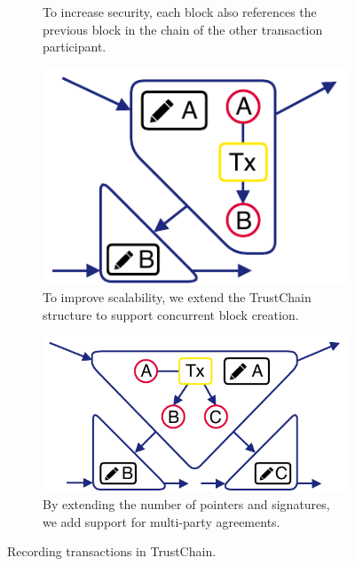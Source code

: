 \begin{figure}[t]
\begin{subfigure}[t]{.33\textwidth}
		\caption{To increase security, each block also references the previous block in the chain of the other transaction participant.}
		\label{fig:trustchain_tutorial_3}
	\end{subfigure}
	\par\bigskip
	\begin{subfigure}[t]{.33\textwidth}
		\centering
		\captionsetup{width=.9\linewidth}
		\includegraphics[width=.7\linewidth]{xchange/assets/trustchain_tutorial_4}
		\caption{To improve scalability, we extend the TrustChain structure to support concurrent block creation.}
		\label{fig:trustchain_tutorial_4}
	\end{subfigure}\hspace{0.05\textwidth}%
	\begin{subfigure}[t]{.33\textwidth}
		\centering
		\captionsetup{width=\linewidth}
		\includegraphics[width=\linewidth]{xchange/assets/trustchain_tutorial_5}
		\caption{By extending the number of pointers and signatures, we add support for multi-party agreements.}
		\label{fig:trustchain_tutorial_5}
	\end{subfigure}
	\caption{Recording transactions in TrustChain.}
	\label{fig:trustchain_tutorial}
\end{figure}

